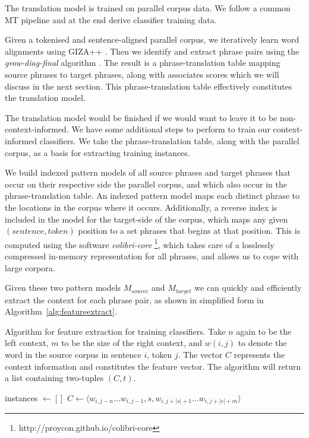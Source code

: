 \documentclass[smallextended]{svjour3}       %
\theoremstyle{break}
\begin{document}
The translation model is trained on parallel corpus data. We follow a common
MT pipeline and at the end derive classifier training data.

Given a tokenised and sentence-aligned parallel corpus, we iteratively learn
word alignments using GIZA++ \citep{GIZA}. Then we identify and extract phrase
pairs using the {\em grow-diag-final}\/ algorithm \citep{OchNey2003}. The
result is a phrase-translation table mapping source phrases to target
phrases, along with associates scores which we will discuss in the next
section. This phrase-translation table effectively constitutes the translation
model.

The translation model would be finished if we would want to leave it to be
non-context-informed. We have some additional steps to perform to train our
context-informed classifiers. We take the phrase-translation table, along with
the parallel corpus, as a basis for extracting training instances.

We build indexed pattern models of all source phrases and target phrases that
occur on their respective side the parallel corpus, and which also occur in the 
phrase-translation table. An indexed pattern model maps each distinct phrase to
the locations in the corpus where it occurs.  Additionally, a reverse index is
included in the model for the target-side of the corpus, which maps any given
$(sentence, token)$ position to a set phrases that begins at that position.
This is computed using the software \emph{colibri-core}
\footnote{http://proycon.github.io/colibri-core}, which takes care of a
losslessly compressed in-memory representation for all phrases, and allows us
to cope with large corpora.

Given these two pattern models $M_{source}$ and $M_{target}$ we can quickly and
efficiently extract the context for each phrase pair, as shown in simplified
form in Algorithm~\ref{alg:featureextract}.  

\begin{algorithm}
\caption{Algorithm for feature extraction for training classifiers.  Take $n$
again to be the left context, $m$ to be the size of the right context, and
$w{(i,j)}$ to denote the word in the source corpus in sentence $i$, token $j$.
The vector $C$ represents the context information and constitutes the feature
vector.  The algorithm will return a list containing two-tuples $(C,t)$.  }
\label{alg:featureextract}
\begin{algorithmic}
\State instances $\gets []$
        \State $C \gets \langle w_{i,j-n} \ldots w_{i,j-1}, s, w_{i,j+|s|+1} \ldots w_{i,j+|s|+m} \rangle$
        \State {} 
      \EndFor
  \EndFor
\EndFor \\
\end{algorithmic}
\end{algorithm}
    
\end{document}
